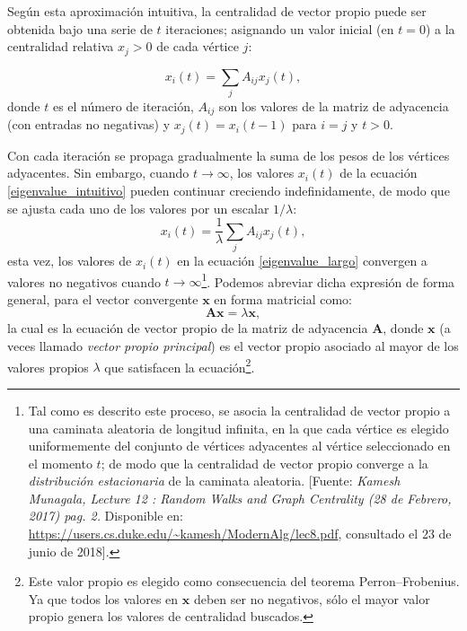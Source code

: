\documentclass[letterpaper, 11pt]{book}
\theoremstyle{definition}
\theoremstyle{remark}
\begin{document}
Según esta aproximación intuitiva, la centralidad de vector propio puede ser obtenida bajo una serie de $t$ iteraciones; asignando un valor inicial (en $t=0$) a la centralidad relativa $x_{j} > 0$ de cada vértice $j$:

\begin{equation}\label{eigenvalue_intuitivo}
    x_{i}(t) = \sum_{j} A_{ij}x_{j}(t),
\end{equation}
donde $t$ es el número de iteración, $A_{ij}$ son los valores de la matriz de adyacencia (con entradas no negativas) y $x_{j}(t) = x_{i}(t-1)$ para $i=j$ y $t>0$. 


Con cada iteración se propaga gradualmente la suma de los pesos de los vértices adyacentes. 
Sin embargo, cuando $t \rightarrow \infty$, los valores $x_{i}(t)$ de la ecuación \ref{eigenvalue_intuitivo} pueden continuar creciendo indefinidamente, de modo que se ajusta cada uno de los valores por un escalar $1 / \lambda$:
\begin{equation}\label{eigenvalue_largo}
    x_{i}(t) = \dfrac{1}{\lambda}\sum_{j} A_{ij}x_{j}(t),
\end{equation} 
esta vez, los valores de $x_{i}(t)$ en la ecuación \ref{eigenvalue_largo} convergen a valores no negativos cuando $t \rightarrow \infty$\footnote{
    Tal como es descrito este proceso, se asocia la centralidad de vector propio a una caminata aleatoria de longitud infinita, en la que cada vértice es elegido uniformemente del conjunto de vértices adyacentes al vértice seleccionado en el momento $t$; de modo que la centralidad de vector propio converge a la \emph{distribución estacionaria} de la caminata aleatoria. 
    [Fuente: \emph{Kamesh Munagala, Lecture 12 : Random Walks and Graph Centrality (28 de Febrero, 2017) pag. 2.} Disponible en: \url{https://users.cs.duke.edu/~kamesh/ModernAlg/lec8.pdf}, consultado el 23 de junio de 2018].
}. 
Podemos abreviar dicha expresión de forma general, para el vector convergente $\mathbf{x}$ en forma matricial como:
\begin{equation}\label{eigenvalue_centrality}
    \mathbf{A} \mathbf{x} = \lambda \mathbf{x},
\end{equation}
la cual es la ecuación de vector propio de la matriz de adyacencia $\mathbf{A}$, donde $\mathbf{x}$ (a veces llamado \emph{vector propio principal}) es el vector propio asociado al mayor de los valores propios $\lambda$ que satisfacen la ecuación\footnote{
Este valor propio es elegido como consecuencia del teorema Perron--Frobenius. 
Ya que todos los valores en $\mathbf{x}$ deben ser no negativos, sólo el mayor valor propio genera los valores de centralidad buscados. 
}. 
\end{document}
